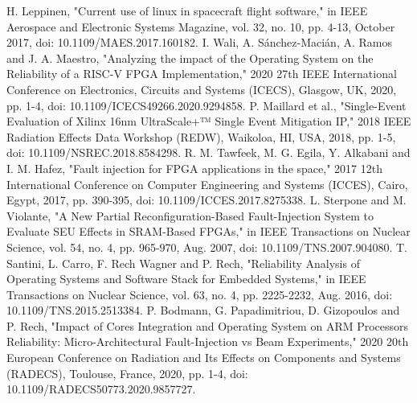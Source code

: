 \documentclass[conference]{IEEEtran}
\begin{document}
\begin{thebibliography}{10}
     H. Leppinen, "Current use of linux in spacecraft flight software," in IEEE Aerospace and Electronic Systems Magazine,
     vol. 32, no. 10, pp. 4-13, October 2017, doi: 10.1109/MAES.2017.160182. 
     I. Wali, A. Sánchez-Macián, A. Ramos and J. A. Maestro, "Analyzing the impact of the Operating System on the Reliability
     of a RISC-V FPGA Implementation," 2020 27th IEEE International Conference on Electronics, Circuits and Systems (ICECS), Glasgow, UK, 2020,
     pp. 1-4, doi: 10.1109/ICECS49266.2020.9294858.
     P. Maillard et al., "Single-Event Evaluation of Xilinx 16nm UltraScale+™ Single Event Mitigation IP," 2018 IEEE Radiation 
     Effects Data Workshop (REDW), Waikoloa, HI, USA, 2018, pp. 1-5, doi: 10.1109/NSREC.2018.8584298.
     R. M. Tawfeek, M. G. Egila, Y. Alkabani and I. M. Hafez, "Fault injection for FPGA applications in the space," 2017 12th
     International Conference on Computer Engineering and Systems (ICCES), Cairo, Egypt, 2017, pp. 390-395, doi: 10.1109/ICCES.2017.8275338.
     L. Sterpone and M. Violante, "A New Partial Reconfiguration-Based Fault-Injection System to Evaluate SEU Effects in SRAM-Based
     FPGAs," in IEEE Transactions on Nuclear Science, vol. 54, no. 4, pp. 965-970, Aug. 2007, doi: 10.1109/TNS.2007.904080.
     T. Santini, L. Carro, F. Rech Wagner and P. Rech, "Reliability Analysis of Operating Systems and Software Stack for Embedded 
     Systems," in IEEE Transactions on Nuclear Science, vol. 63, no. 4, pp. 2225-2232, Aug. 2016, doi: 10.1109/TNS.2015.2513384.
     P. Bodmann, G. Papadimitriou, D. Gizopoulos and P. Rech, "Impact of Cores Integration and Operating System on ARM Processors 
     Reliability: Micro-Architectural Fault-Injection vs Beam Experiments," 2020 20th European Conference on Radiation and Its Effects on 
     Components and Systems (RADECS), Toulouse, France, 2020, pp. 1-4, doi: 10.1109/RADECS50773.2020.9857727.
\end{thebibliography}
\end{document}
